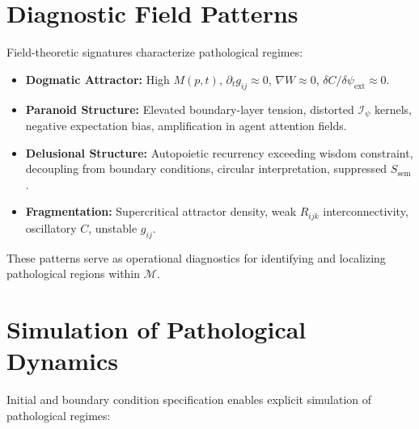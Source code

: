 
\section{Diagnostic Field Patterns}
\label{16.4:diagnostic_field_patterns}

Field-theoretic signatures characterize pathological regimes:

\begin{itemize}

    \item \textbf{Dogmatic Attractor:} High $M(p,t)$, $\partial_t g_{ij} \approx 0$, $\nabla W \approx 0$, $\delta C / \delta \psi_{\text{ext}} \approx 0$.

    \item \textbf{Paranoid Structure:} Elevated boundary-layer tension, distorted $\mathcal{I}_{\psi}$ kernels, negative expectation bias, amplification in agent attention fields.

    \item \textbf{Delusional Structure:} Autopoietic recurrency exceeding wisdom constraint, decoupling from boundary conditions, circular interpretation, suppressed $S_{\text{sem}}$.

    \item \textbf{Fragmentation:} Supercritical attractor density, weak $R_{ijk}$ interconnectivity, oscillatory $C$, unstable $g_{ij}$.

\end{itemize}

These patterns serve as operational diagnostics for identifying and localizing pathological regions within $\mathcal{M}$.


\section{Simulation of Pathological Dynamics}
\label{16.5:simulation_of_pathological_dynamics}

Initial and boundary condition specification enables explicit simulation of pathological regimes:

